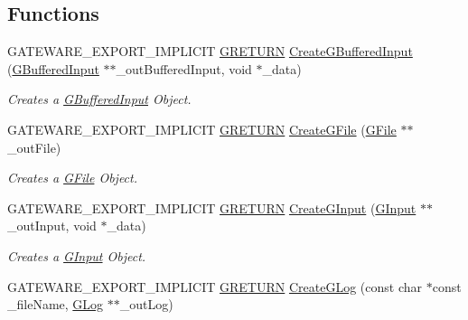 \subsection*{Functions}
\begin{DoxyCompactItemize}
\item 
G\+A\+T\+E\+W\+A\+R\+E\+\_\+\+E\+X\+P\+O\+R\+T\+\_\+\+I\+M\+P\+L\+I\+C\+IT \hyperlink{namespace_g_w_a69b1aaebac1cac8049825f035884c95b}{G\+R\+E\+T\+U\+RN} \hyperlink{namespace_g_w_1_1_c_o_r_e_a004bf4f838aee645e39d1ce291866df4}{Create\+G\+Buffered\+Input} (\hyperlink{class_g_w_1_1_c_o_r_e_1_1_g_buffered_input}{G\+Buffered\+Input} $\ast$$\ast$\+\_\+out\+Buffered\+Input, void $\ast$\+\_\+data)
\begin{DoxyCompactList}\small\item\em Creates a \hyperlink{class_g_w_1_1_c_o_r_e_1_1_g_buffered_input}{G\+Buffered\+Input} Object. \end{DoxyCompactList}\item 
G\+A\+T\+E\+W\+A\+R\+E\+\_\+\+E\+X\+P\+O\+R\+T\+\_\+\+I\+M\+P\+L\+I\+C\+IT \hyperlink{namespace_g_w_a69b1aaebac1cac8049825f035884c95b}{G\+R\+E\+T\+U\+RN} \hyperlink{namespace_g_w_1_1_c_o_r_e_a3ce877cd50653c58bbffd852cebb7a9e}{Create\+G\+File} (\hyperlink{class_g_w_1_1_c_o_r_e_1_1_g_file}{G\+File} $\ast$$\ast$\+\_\+out\+File)
\begin{DoxyCompactList}\small\item\em Creates a \hyperlink{class_g_w_1_1_c_o_r_e_1_1_g_file}{G\+File} Object. \end{DoxyCompactList}\item 
G\+A\+T\+E\+W\+A\+R\+E\+\_\+\+E\+X\+P\+O\+R\+T\+\_\+\+I\+M\+P\+L\+I\+C\+IT \hyperlink{namespace_g_w_a69b1aaebac1cac8049825f035884c95b}{G\+R\+E\+T\+U\+RN} \hyperlink{namespace_g_w_1_1_c_o_r_e_aec1bf5a7404f981ce2b33a35324d7f80}{Create\+G\+Input} (\hyperlink{class_g_w_1_1_c_o_r_e_1_1_g_input}{G\+Input} $\ast$$\ast$\+\_\+out\+Input, void $\ast$\+\_\+data)
\begin{DoxyCompactList}\small\item\em Creates a \hyperlink{class_g_w_1_1_c_o_r_e_1_1_g_input}{G\+Input} Object. \end{DoxyCompactList}\item 
G\+A\+T\+E\+W\+A\+R\+E\+\_\+\+E\+X\+P\+O\+R\+T\+\_\+\+I\+M\+P\+L\+I\+C\+IT \hyperlink{namespace_g_w_a69b1aaebac1cac8049825f035884c95b}{G\+R\+E\+T\+U\+RN} \hyperlink{namespace_g_w_1_1_c_o_r_e_a9bdc51fd3fbbb50336dfb4c0b4d35d69}{Create\+G\+Log} (const char $\ast$const \+\_\+file\+Name, \hyperlink{class_g_w_1_1_c_o_r_e_1_1_g_log}{G\+Log} $\ast$$\ast$\+\_\+out\+Log)

\end{DoxyCompactItemize}
